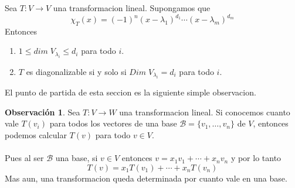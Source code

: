 \documentclass{article}
\theoremstyle{definition}
\theoremstyle{definition}
\newtheorem*{obs}{Observación}
\theoremstyle{remark}
\begin{document}
\begin{corol}
  Sea $T : V \to V$ una transformacion lineal. Supongamos que \[
    \chi_{T}(x)=(-1)^n(x-\lambda_1)^{d_1}\cdots (x-\lambda_m)^{d_{m}}
  \]
  Entonces \begin{enumerate}[label=(\arabic*)]
    \item $1 \leq dim \; V_{\lambda_{i}} \leq d_i$ para todo $i$. 
    \item $T$ es diagonalizable si y solo si $Dim \; V_{\lambda_{i}}=d_i$ para todo $i$.
  \end{enumerate}
\end{corol}
El punto de partida de esta seccion es la siguiente simple observacion. \begin{obs}
  Sea $T : V \to W$ una transformacion lineal. Si conocemos cuanto vale $T(v_i)$ para todos los vectores de una base $\mathcal{B}=\{v_1, \dots ,v_n\}$ de $V$, entonces podemos calcular $T(v)$ para todo $v \in V$.\\\\ Pues al ser $\mathcal{B}$ una base, si $v \in V$ entonces $v= x_1v_1 + \cdots + x_n v_n$ y por lo tanto \[
T(v)=x_1T(v_1) + \cdots + x_n T(v_n)  \]
Mas aun, una transformacion queda determinada por cuanto vale en una base.
\end{obs}\pagebreak
\end{document}
